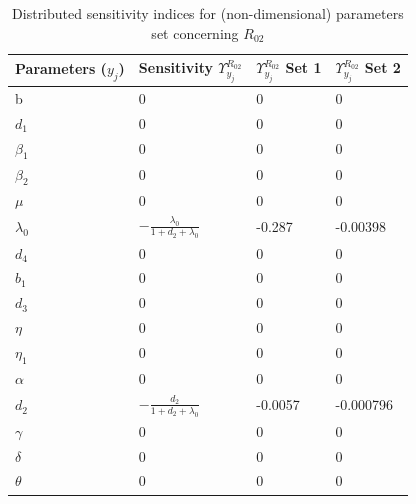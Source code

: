 \begin{table}[h]
\label{table:senst}
\begin{tabular}{|p{3 cm}|p{4 cm}|p{3 cm}|p{3 cm}|}
\hline
\bf Parameters ($y_j$) & \bf Sensitivity $ \Upsilon_{y_j}^{R_{02}} $&\bf $ \Upsilon_{y_j}^{R_{02}} $ Set 1&\bf $ \Upsilon_{y_j}^{R_{02}} $ Set 2 \\
\hline
b &0&0&0\\
$d_1$ &0&0&0\\
$\beta_1$ &0&0&0\\
$\beta_2$ &0&0&0\\
$\mu$ &0&0&0\\
$\lambda_0$ &$-\frac{\lambda_0}{1+d_2+\lambda_0}$&-0.287&-0.00398\\
$d_4$ &0&0&0\\
$b_1$ &0&0&0\\
$d_3$ &0&0&0\\
$\eta$ &0&0&0\\
$\eta_1$ &0&0&0\\
$\alpha$ &0&0&0\\
$d_2$ &$-\frac{d_2}{1+d_2+\lambda_0}$&-0.0057&-0.000796\\
$\gamma$ &0&0&0\\
$\delta$&0&0&0\\
$\theta$ &0&0&0\\
\hline
\end{tabular}
\caption {Distributed sensitivity indices for (non-dimensional) parameters set concerning $R_{02}$ }
\end{table}

